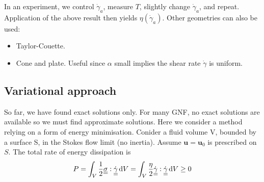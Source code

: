\documentclass{jknotes}
\newcommand{\dunder}[1]{\underline{\underline{#1}}}
\newcommand{\srate}{\dot{\gamma}}
\begin{document}
In an experiment, we control $\srate_a$, measure $T$, slightly change
$\srate_a$, and repeat. Application of the above result then yields
$\eta(\srate_a)$. Other geometries can also be used:
\begin{itemize}
	\item Taylor-Couette.
		\begin{center}
		\end{center}
	\item Cone and plate. Useful since $\alpha$ small implies the shear rate
		$\srate$ is uniform.
		\begin{center}
		\end{center}
\end{itemize}

\subsection{Variational approach}
So far, we have found exact solutions only. For many GNF, no exact solutions
are available so we must find approximate solutions. Here we consider a method
relying on a form of energy minimisation. Conider a fluid volume V, bounded by
a surface S, in the Stokes flow limit (no inertia). Assume $\bm{u} = \bm{u}_0$
is prescribed on $S$. The total rate of energy dissipation is
\begin{equation}
	P = \int_V \frac{1}{2}\dunder{\sigma}:\dunder{\srate}\,\diffd V = \int_V
	\frac{\eta}{2} \dunder{\srate}:\dunder{\srate} \, \diffd V \ge 0
\end{equation}
\end{document}
